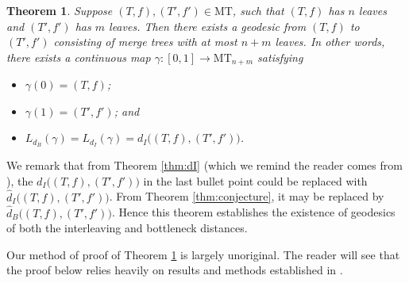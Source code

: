 \documentclass{article}
\newtheorem{theorem}{Theorem}
\theoremstyle{definition}
\newcommand{\MT}{\mathrm{MT}}
\begin{document}
\begin{theorem}
    \label{thm:geodesics}
    Suppose $(T,f), (T',f') \in \MT$, such that $(T,f)$ has $n$ leaves and $(T',f')$ has $m$ leaves. Then there exists a geodesic from $(T,f)$ to $(T',f')$ consisting of merge trees with at most $n + m$ leaves. In other words, there exists a continuous map $\gamma:[0,1] \to \MT_{n + m}$ satisfying
    \begin{itemize}
        \item $\gamma(0) = (T,f)$;
        \item $\gamma(1) = (T',f')$; and
        \item $L_{d_B}(\gamma) = L_{d_I}(\gamma)  = d_I\big((T,f),(T',f')\big)$.
    \end{itemize}
\end{theorem}

We remark that from Theorem \ref{thm:dI} (which we remind the reader comes from \cite{gasparovic2025intrinsic}), the $d_I\big((T,f),(T',f')\big)$ in the last bullet point could be replaced with $\widehat{d}_I\big((T,f),(T',f')\big)$. From Theorem \ref{thm:conjecture}, it may be replaced by $\widehat{d}_B\big((T,f),(T',f')\big)$. Hence this theorem establishes the existence of geodesics of both the interleaving and bottleneck distances.

Our method of proof of Theorem \ref{thm:geodesics} is largely unoriginal. The reader will see that the proof below relies heavily on results and methods established in \cite{gasparovic2025intrinsic}.
\end{document}
